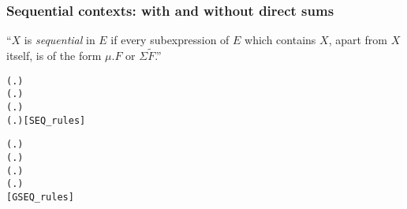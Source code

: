\begin{frame}[fragile]
\frametitle{Sequential contexts: with and without direct sums}
``$X$ is \emph{sequential} in $E$ if every subexpression of $E$ which
contains $X$, apart from $X$ itself, is of the form $\mu.F$ or
$\Sigma \tilde{F}$.''
\begin{alltt}
 (\HOLTokenLambda{}. )
 (\HOLTokenLambda{}. )
  \HOLSymConst{\HOLTokenImp{}}  (\HOLTokenLambda{}.  )
  \HOLSymConst{\HOLTokenConj{}}   \HOLSymConst{\HOLTokenImp{}}  (\HOLTokenLambda{}.   \HOLSymConst{\ensuremath{+}}  )\hfill{[SEQ_rules]}
\end{alltt}
\begin{alltt}
 (\HOLTokenLambda{}. )
 (\HOLTokenLambda{}. )
  \HOLSymConst{\HOLTokenImp{}}  (\HOLTokenLambda{}.  )
  \HOLSymConst{\HOLTokenConj{}}   \HOLSymConst{\HOLTokenImp{}}  (\HOLTokenLambda{}.   \HOLSymConst{\ensuremath{+}}  )
\hfill{[GSEQ_rules]}
\end{alltt}
\end{frame}

